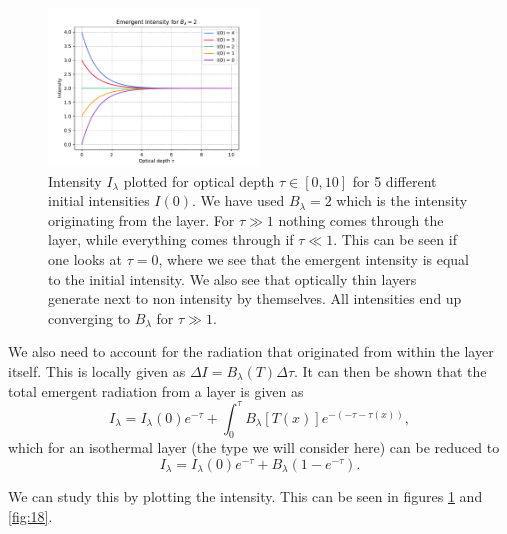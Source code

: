 \documentclass[a4paper,11.5pt,]{article}
\begin{document}
\begin{multicols}{2}
\begin{figure}[H]
	\centering
	\includegraphics[width=0.5\textwidth]{SSA/figures/opticaldepth.pdf}
	\caption{Intensity $I_\lambda$ plotted for optical depth $\tau \in [0,10]$ for 5 different initial intensities $I(0)$. We have used $B_\lambda = 2$ which is the intensity originating from the layer. For $\tau \gg 1$ nothing comes through the layer, while everything comes through if $\tau \ll 1$. This can be seen if one looks at $\tau = 0$, where we see that the emergent intensity is equal to the initial intensity. We also see that optically thin layers generate next to non intensity by themselves. All intensities end up converging to $B_\lambda$ for $\tau \gg 1$.}
	\label{fig:17}
\end{figure}

We also need to account for the radiation that originated from within the layer itself. This is locally given as $\Delta I = B_\lambda(T) \Delta \tau$.
It can then be shown that the total emergent radiation from a layer is given as
\begin{equation}
    I_\lambda = I_\lambda(0) e^{-\tau} + \int_0^\tau B_\lambda [T(x)] e^{-(-\tau - \tau(x))},
\end{equation}
which for an isothermal layer (the type we will consider here) can be reduced to
\begin{equation}
    I_\lambda = I_\lambda(0) e^{-\tau} + B_\lambda (1- e^{-\tau}).
\end{equation}

We can study this by plotting the intensity. This can be seen in figures \ref{fig:17} and \ref{fig:18}.


\end{multicols}
\end{document}
